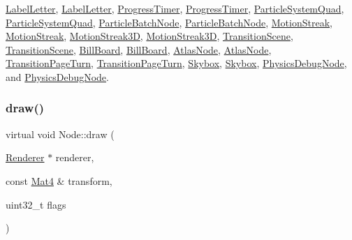 \hyperlink{classLabelLetter_a676b176ed411500ac50b45c7cb104ce0}{Label\+Letter}, \hyperlink{classLabelLetter_a3e0850000ea292406f5d905a431b03dc}{Label\+Letter}, \hyperlink{classProgressTimer_a93e4e885d40db09173bea0a7cf19addb}{Progress\+Timer}, \hyperlink{classProgressTimer_aeff75c55be12ed0c7cc8893140c78de6}{Progress\+Timer}, \hyperlink{classParticleSystemQuad_ab2e534c8bfc790921b3519647ab91073}{Particle\+System\+Quad}, \hyperlink{classParticleSystemQuad_a4bfacab6a326829bcc97be90ea9c6a01}{Particle\+System\+Quad}, \hyperlink{classParticleBatchNode_a780eb41e700d1c44f07dcca694431567}{Particle\+Batch\+Node}, \hyperlink{classParticleBatchNode_a05ece10bbbbb5566e28ba1365498eb91}{Particle\+Batch\+Node}, \hyperlink{classMotionStreak_a5cde4c7320bde796324d67ac11125a1f}{Motion\+Streak}, \hyperlink{classMotionStreak_aba3df66a00afb1a9c46178da191041df}{Motion\+Streak}, \hyperlink{classMotionStreak3D_a3b13ccd501ac16227a117870695f34f1}{Motion\+Streak3D}, \hyperlink{classMotionStreak3D_a108b68a6e6a37a5bc307761c1d14fdaa}{Motion\+Streak3D}, \hyperlink{classTransitionScene_ac66bc3e8b2853b3b7078eea2339c9245}{Transition\+Scene}, \hyperlink{classTransitionScene_ae3600e652909eeae3113bc39ce8ef8d1}{Transition\+Scene}, \hyperlink{classBillBoard_a61816c66a9b5dbfbe12cf1bd747f5229}{Bill\+Board}, \hyperlink{classBillBoard_ab8ccc9dc2cbbf46f1f2a56cd0283ce94}{Bill\+Board}, \hyperlink{classAtlasNode_af4fb010941d0fd8d26c14a5c524a6b55}{Atlas\+Node}, \hyperlink{classAtlasNode_aa396ca085059861b67e3ad9471de797c}{Atlas\+Node}, \hyperlink{classTransitionPageTurn_a2df5e0dc13a58e5ac7c8ce27703bd384}{Transition\+Page\+Turn}, \hyperlink{classTransitionPageTurn_a1e00260a163de7b41a5827ee9ed34d61}{Transition\+Page\+Turn}, \hyperlink{classSkybox_a6276d85580a2b725dd5dac0c4837c640}{Skybox}, \hyperlink{classSkybox_a08385a028880991afa6550e25720c37e}{Skybox}, \hyperlink{classPhysicsDebugNode_a71bda24e446762fc1a1ae2d31927d19a}{Physics\+Debug\+Node}, and \hyperlink{classPhysicsDebugNode_a78fe785679cead2a155f0f767932a89f}{Physics\+Debug\+Node}.

\mbox{\label{classNode_a6f8fdadb6e26b198cb15920e4d998754}} 
\subsubsection{\texorpdfstring{draw()}{draw()}\hspace{0.1cm}{\footnotesize\ttfamily [2/2]}}
{\footnotesize\ttfamily virtual void Node\+::draw (\begin{DoxyParamCaption}\item[{\hyperlink{classRenderer}{Renderer} $\ast$}]{renderer,  }\item[{const \hyperlink{classMat4}{Mat4} \&}]{transform,  }\item[{uint32\+\_\+t}]{flags }\end{DoxyParamCaption})\hspace{0.3cm}{\ttfamily [virtual]}}

